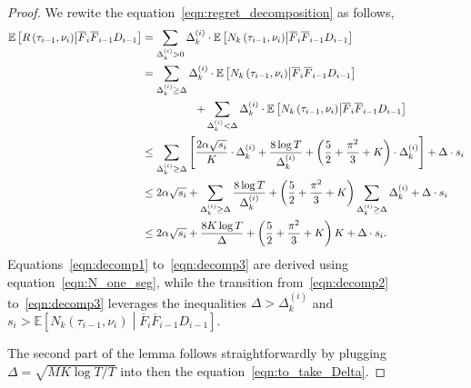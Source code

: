 \documentclass[twoside]{article}
\newcommand{\E}{\mathbb{E}}
\theoremstyle{plain}
\theoremstyle{definition}
\theoremstyle{remark}
\begin{document}

\begin{proof}
    We rewite the equation~\ref{eqn:regret_decomposition} as follows,
    \begin{subequations}
        \begin{align}
            \E\left[R\left(\tau_{i-1},\nu_{i}\right)\middle|\overline{F}_{i}\overline{F}_{i-1}D_{i-1}\right]&=\sum_{\Delta^{\left(i\right)}_{k}>0}\Delta^{\left(i\right)}_{k}\cdot \E\left[N_{k}\left(\tau_{i-1},\nu_{i}\right)\middle|\overline{F}_{i}\overline{F}_{i-1}D_{i-1}\right]\\
            &=\sum_{\Delta^{\left(i\right)}_{k}\geq\Delta}\Delta^{\left(i\right)}_{k}\cdot \E\left[N_{k}\left(\tau_{i-1},\nu_{i}\right)\middle|\overline{F}_{i}\overline{F}_{i-1}D_{i-1}\right]\label{eqn:decomp1}\\
            +\sum_{\Delta^{\left(i\right)}_{k}<\Delta}\Delta^{\left(i\right)}_{k}\cdot \E\left[N_{k}\left(\tau_{i-1},\nu_{i}\right)\middle|\overline{F}_{i}\overline{F}_{i-1}D_{i-1}\right]\hspace{-8.5cm}\label{eqn:decomp2}\\
            &\leq \sum_{\Delta^{\left(i\right)}_{k}\geq\Delta}\left[\frac{2\alpha\sqrt{s_{i}}}{K}\cdot\Delta^{(i)}_{k}+\frac{8\log{T}}{\Delta^{\left(i\right)}_{k}}+\left(\frac{5}{2}+\frac{\pi^{2}}{3}+K\right)\cdot\Delta^{(i)}_{k}\right]+\Delta\cdot s_{i}\label{eqn:decomp3}\\
            &\leq 2\alpha\sqrt{s_{i}}+\sum_{\Delta^{(i)}_{k}\geq \Delta}\frac{8\log{T}}{\Delta^{\left(i\right)}_{k}}+\left(\frac{5}{2}+\frac{\pi^{2}}{3}+K\right)\sum_{\Delta^{(i)}_{k}\geq \Delta}\Delta^{(i)}_{k}+\Delta\cdot s_{i}\\
            &\leq 2\alpha\sqrt{s_{i}}+\frac{8K\log{T}}{\Delta}+\left(\frac{5}{2}+\frac{\pi^{2}}{3}+K\right)K+\Delta\cdot s_{i}. \label{eqn:to_take_Delta}
        \end{align}
    \end{subequations}
    Equations~\ref{eqn:decomp1} to~\ref{eqn:decomp3} are derived using equation~\ref{eqn:N_one_seg}, while the transition from~\ref{eqn:decomp2} to~\ref{eqn:decomp3} leverages the inequalities $\Delta > \Delta^{(i)}_k$ and $s_{i} > \mathbb{E}\left[N_{k}\left(\tau_{i-1},\nu_{i}\right)\middle|\overline{F}_{i}\overline{F}_{i-1}D_{i-1}\right]$. 
    
    The second part of the lemma follows straightforwardly by plugging $\Delta=\sqrt{MK\log{T}/T}$ into then the equation~\ref{eqn:to_take_Delta}.
\end{proof}
\end{document}
